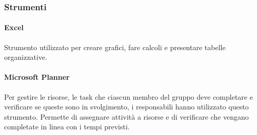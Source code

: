 \subsubsection{Strumenti}
\paragraph{Excel}
Strumento utilizzato per creare grafici, fare calcoli e presentare tabelle organizzative.
\paragraph{Microsoft Planner}
Per gestire le risorse, le task che ciascun membro del gruppo deve completare e verificare se queste sono in svolgimento, i responsabili hanno utilizzato questo strumento. Permette di assegnare attività a risorse e di verificare che vengano completate in linea con i tempi previsti.